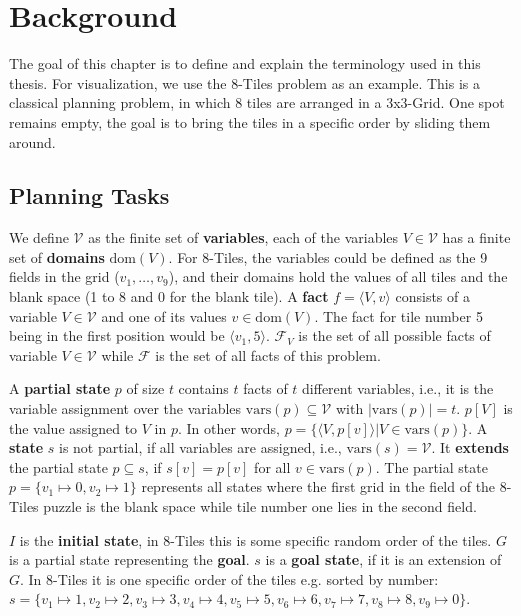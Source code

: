 
\chapter{Background}\label{ch:background}

The goal of this chapter is to define and explain the terminology used in this thesis.
For visualization, we use the 8-Tiles problem as an example.
This is a classical planning problem, in which 8 tiles are arranged in a 3x3-Grid.
One spot remains empty, the goal is to bring the tiles in a specific order by sliding them around.

\section {Planning Tasks}\label{sec:planning-tasks}
We define $\mathcal{V}$ as the finite set of \textbf{variables}, each of the variables $V\in\mathcal{V}$ has a finite set of \textbf{domains} $\text{dom}(V)$.
For 8-Tiles, the variables could be defined as the 9 fields in the grid ($v_1,\dots,v_9$), and their domains hold the values of all tiles and the blank space (1 to 8 and 0 for the blank tile).
A \textbf{fact} $f=\langle V, v\rangle$ consists of a variable $V\in\mathcal{V}$ and one of its values $v\in\text{dom}(V)$.
The fact for tile number 5 being in the first position would be $\langle v_1,5\rangle$.
$\mathcal{F}_V$ is the set of all possible facts of variable $V\in\mathcal{V}$ while $\mathcal{F}$ is the set of all facts of this problem.

A \textbf{partial state} $p$ of size $t$ contains $t$ facts of $t$ different variables, i.e., it is the variable assignment over the variables $\text{vars}(p)\subseteq\mathcal{V}$ with $|\text{vars}(p)|=t$.
$p[V]$ is the value assigned to $V$ in $p$.
In other words, $p=\{\langle V, p[v] \rangle | V\in\text{vars}(p)\}$.
A \textbf{state} $s$ is not partial, if all variables are assigned, i.e., $\text{vars}(s)=\mathcal{V}$.
It \textbf{extends} the partial state $p\subseteq s$, if $s[v] = p[v]$ for all $v \in\text{vars}(p)$.
The partial state $p = \{v_1\mapsto0, v_2\mapsto1\}$ represents all states where the first grid in the field of the 8-Tiles puzzle is the blank space while tile number one lies in the second field.

$I$ is the \textbf{initial state}, in 8-Tiles this is some specific random order of the tiles.
$G$ is a partial state representing the \textbf{goal}. $s$ is a \textbf{goal state}, if it is an extension of $G$.
In 8-Tiles it is one specific order of the tiles e.g. sorted by number:
$s = \{v_1\mapsto1, v_2\mapsto2, v_3\mapsto3, v_4\mapsto4, v_5\mapsto5, v_6\mapsto6, v_7\mapsto7, v_8\mapsto8, v_9\mapsto0\}$.

